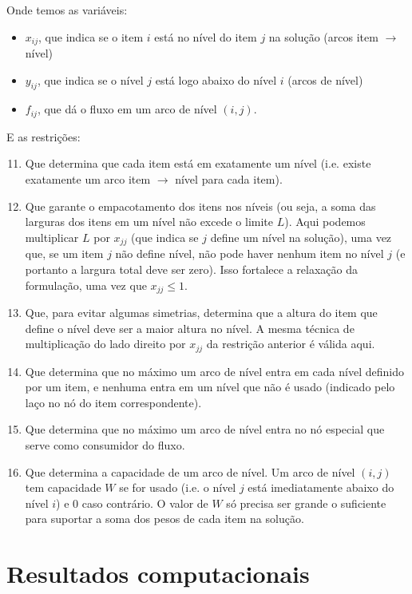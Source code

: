 \documentclass{article}
\begin{document}
Onde temos as variáveis:
\begin{itemize}
    \item $x_{ij}$, que indica se o item $i$ está no nível do item $j$ na solução (arcos item $\rightarrow$ nível)
    \item $y_{ij}$, que indica se o nível $j$ está logo abaixo do nível $i$ (arcos de nível)
    \item $f_{ij}$, que dá o fluxo em um arco de nível $(i, j)$.
\end{itemize}

E as restrições:
\begin{enumerate}[(1)]
    \setcounter{enumi}{10}
    \item Que determina que cada item está em exatamente um nível (i.e. existe exatamente um arco item $\rightarrow$ nível para cada item).
    \item Que garante o empacotamento dos itens nos níveis (ou seja, a soma das larguras dos itens em um nível não excede o limite $L$). Aqui podemos multiplicar $L$ por $x_{jj}$ (que indica se $j$ define um nível na solução), uma vez que, se um item $j$ não define nível, não pode haver nenhum item no nível $j$ (e portanto a largura total deve ser zero). Isso fortalece a relaxação da formulação, uma vez que $x_{jj} \leq 1$.
    \item Que, para evitar algumas simetrias, determina que a altura do item que define o nível deve ser a maior altura no nível. A mesma técnica de multiplicação do lado direito por $x_{jj}$ da restrição anterior é válida aqui.
    \item Que determina que no máximo um arco de nível entra em cada nível definido por um item, e nenhuma entra em um nível que não é usado (indicado pelo laço no nó do item correspondente).
    \item Que determina que no máximo um arco de nível entra no nó especial que serve como consumidor do fluxo.
    \item Que determina a capacidade de um arco de nível. Um arco de nível $(i, j)$ tem capacidade $W$ se for usado (i.e. o nível $j$ está imediatamente abaixo do nível $i$) e 0 caso contrário. O valor de $W$ só precisa ser grande o suficiente para suportar a soma dos pesos de cada item na solução.
\end{enumerate}

\section{Resultados computacionais}
\end{document}

